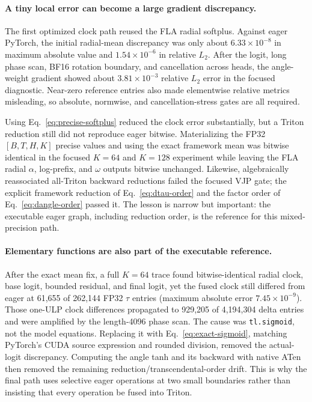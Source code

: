 \documentclass[11pt]{article}
\begin{document}
\paragraph{A tiny local error can become a large gradient discrepancy.}
The first optimized clock path reused the FLA radial softplus.  Against eager PyTorch, the initial
radial-mean discrepancy was only about $6.33\times10^{-8}$ in maximum absolute value and
$1.54\times10^{-6}$ in relative $L_2$.  After the logit, long phase scan, BF16 rotation boundary,
and cancellation across heads, the angle-weight gradient showed about $3.81\times10^{-3}$ relative
$L_2$ error in the focused diagnostic.  Near-zero reference entries also made elementwise relative
metrics misleading, so absolute, normwise, and cancellation-stress gates are all required.

Using Eq.~\eqref{eq:precise-softplus} reduced the clock error substantially, but a Triton reduction
still did not reproduce eager bitwise.  Materializing the FP32 $[B,T,H,K]$ precise values and using
the exact framework mean was bitwise identical in the focused $K=64$ and $K=128$ experiment while
leaving the FLA radial $\alpha$, log-prefix, and $\omega$ outputs bitwise unchanged.  Likewise,
algebraically reassociated all-Triton backward reductions failed the focused VJP gate; the explicit
framework reduction of Eq.~\eqref{eq:dtau-order} and the factor order of
Eq.~\eqref{eq:dangle-order} passed it.  The lesson is narrow but important: the executable eager
graph, including reduction order, is the reference for this mixed-precision path.

\paragraph{Elementary functions are also part of the executable reference.}
After the exact mean fix, a full $K=64$ trace found bitwise-identical radial clock, base logit,
bounded residual, and final logit, yet the fused clock still differed from eager at 61,655 of
262,144 FP32 $\tau$ entries (maximum absolute error $7.45\times10^{-9}$).  Those one-ULP clock
differences propagated to 929,205 of 4,194,304 delta entries and were amplified by the length-4096
phase scan.  The cause was \texttt{tl.sigmoid}, not the model equations.  Replacing it with
Eq.~\eqref{eq:exact-sigmoid}, matching PyTorch's CUDA source expression and rounded division,
removed the actual-logit discrepancy.  Computing the angle tanh and its backward with native ATen
then removed the remaining reduction/transcendental-order drift.  This is why the final path uses
selective eager operations at two small boundaries rather than insisting that every operation be
fused into Triton.
\end{document}
